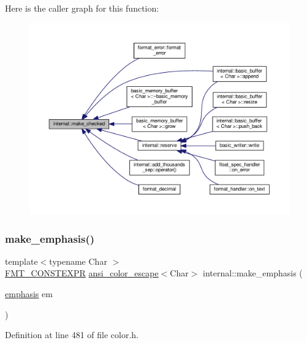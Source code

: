 Here is the caller graph for this function\+:
\nopagebreak
\begin{figure}[H]
\begin{center}
\leavevmode
\includegraphics[width=350pt]{namespaceinternal_a887ca8a3160ba683e62bd9d7418e821f_icgraph}
\end{center}
\end{figure}
\mbox{\label{namespaceinternal_a09a404b74dbbf80f1705c723f775e12f}} 
\subsubsection{\texorpdfstring{make\+\_\+emphasis()}{make\_emphasis()}}
{\footnotesize\ttfamily template$<$typename Char $>$ \\
\hyperlink{core_8h_a69201cb276383873487bf68b4ef8b4cd}{F\+M\+T\+\_\+\+C\+O\+N\+S\+T\+E\+X\+PR} \hyperlink{structinternal_1_1ansi__color__escape}{ansi\+\_\+color\+\_\+escape}$<$Char$>$ internal\+::make\+\_\+emphasis (\begin{DoxyParamCaption}\item[{\hyperlink{color_8h_a535b59b8edc8902bb3c4f254625f91ba}{emphasis}}]{em }\end{DoxyParamCaption})}



Definition at line 481 of file color.\+h.

\mbox{\label{namespaceinternal_a56894b652f5ab606bb044029aa8a779f}} 

